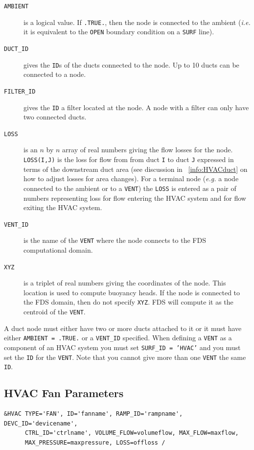 \documentclass[11pt]{book}
\newcommand{\ct}{\tt\small}
\begin{document}
\begin{description}
\item[{\ct AMBIENT}] is a logical value.  If {\ct .TRUE.}, then the node is connected to the ambient ({\em i.e.} it is equivalent to the {\ct OPEN} boundary condition on a {\ct SURF} line).
\item[{\ct DUCT\_ID}] gives the {\ct ID}s of the ducts connected to the node.  Up to 10 ducts can be connected to a node.
\item[{\ct FILTER\_ID}] gives the {\ct ID} a filter located at the node.  A node with a filter can only have two connected ducts.
\item[{\ct LOSS}] is an $n$ by $n$ array of real numbers giving the flow losses for the node.  {\ct LOSS(I,J)} is the loss for flow from from duct {\ct I} to duct {\ct J} expressed in terms of the downstream duct area (see discussion in ~\ref{info:HVACduct} on how to adjust losses for area changes).  For a terminal node ({\em e.g.} a node connected to the ambient or to a {\ct VENT}) the {\ct LOSS} is entered as a pair of numbers representing loss for flow entering the HVAC system and for flow exiting the HVAC system.
\item[{\ct VENT\_ID}] is the name of the {\ct VENT} where the node connects to the FDS computational domain.
\item[{\ct XYZ}] is a triplet of real numbers giving the coordinates of the node.  This location is used to compute buoyancy heads.
If the node is connected to the FDS domain, then do not specify {\ct XYZ}.  FDS will compute it as the centroid of the {\ct VENT}.
\end{description}

A duct node must either have two or more ducts attached to it or it must have either {\ct AMBIENT = .TRUE.} or a {\ct VENT\_ID} specified.  When defining a {\ct VENT} as a component of an HVAC system you must set {\ct SURF\_ID = 'HVAC'} and you must set the {\ct ID} for the {\ct VENT}.  Note that you cannot give more than one  {\ct VENT} the same {\ct ID}.

\subsection{HVAC Fan Parameters}
\label{info:HVACfan}
\footnotesize
\begin{verbatim}
&HVAC TYPE='FAN', ID='fanname', RAMP_ID='rampname',  DEVC_ID='devicename',
      CTRL_ID='ctrlname', VOLUME_FLOW=volumeflow, MAX_FLOW=maxflow,
      MAX_PRESSURE=maxpressure, LOSS=offloss /
\end{verbatim}\normalsize
\end{document}
